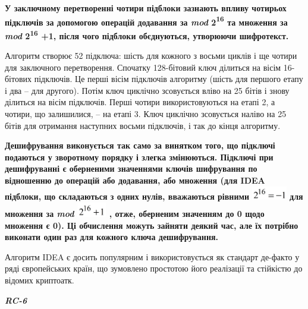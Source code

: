 \documentclass[a4paper]{article}
\newcounter{}
\begin{document}
\bigskip

{\bfseries
\textmd{У заключному перетворенні  чотири підблоки зазнають впливу чотирьох
підключів за допомогою операцій }\textmd{додавання за
}\textmd{\textit{mod}}\textmd{\textit{
}}\textmd{2}\textmd{\textsuperscript{16}}\textit{  }\textmd{та
}\textmd{множення за }\textmd{\textit{mod}}\textmd{
}\textmd{2}\textmd{\textsuperscript{16}}\textmd{ +1, після чого підблоки
об{\textquotesingle}єднуються, утворюючи шифротекст.}}

Алгоритм створює 52 підключа: шість для кожного з восьми циклів і ще чотири для
заключного перетворення. Спочатку 128-бітовий ключ ділиться на вісім 16-бітових
підключів. Це перші вісім підключів алгоритму (шість для першого етапу і два –
для другого). Потім ключ циклічно зсовується вліво на 25 бітів і знову ділиться
на вісім підключів. Перші чотири використовуються на етапі 2, а чотири, що
залишилися, – на етапі 3. Ключ циклічно зсовується наліво на 25 бітів для
отримання наступних восьми підключів, і так до кінця алгоритму.

{\bfseries
\textmd{Дешифрування виконується так само за винятком того, що
}\textmd{підключі}\textmd{ подаються у зворотному порядку і злегка змінюються. 
Підключі  при  дешифруванні  є  оберненими  значеннями  ключів  шифрування  по
відношенню до  операцій  або  додавання,  або  множення (для  IDEA  підблоки, 
що складаються  з  одних  нулів, вважаються рівними }
\includegraphics[width=0.5965in,height=0.2362in]{crypt-img/crypt-img302.png}
\textmd{ для множення за  }\textmd{\textit{mod}}\textmd{ }
\includegraphics[width=0.5043in,height=0.252in]{crypt-img/crypt-img303.png}
\textmd{, отже, оберненим значенням до }\textmd{0 }\textmd{щодо множення є 0).
Ці обчислення можуть зайняти деякий час, але їх потрібно виконати один раз для 
кожного  ключа  дешифрування.  }}


\bigskip

Алгоритм IDEA є досить популярним і використовується як стандарт де-факто у ряді
європейських країн, що зумовлено простотою його реалізації та стійкістю до
відомих криптоатк.


\bigskip


\bigskip

{\centering\bfseries\itshape
RC-6
\par}
\end{document}
